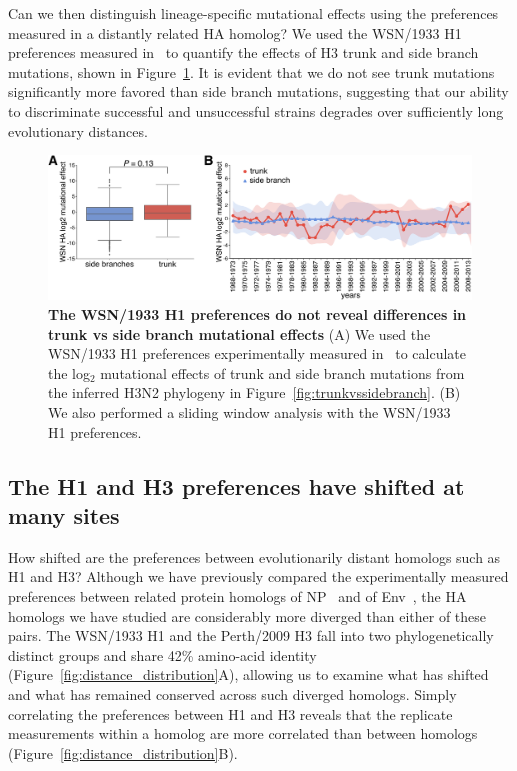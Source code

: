 \documentclass[9pt,twocolumn,twoside]{pnas-new}
\begin{document}
Can we then distinguish lineage-specific mutational effects using the preferences measured in a distantly related HA homolog?
We used the WSN/1933 H1 preferences measured in~\cite{doud2016accurate} to quantify the effects of H3 trunk and side branch mutations, shown in Figure~\ref{fig:WSN_trunkvssidebranch}.
It is evident that we do not see trunk mutations significantly more favored than side branch mutations, suggesting that our ability to discriminate successful and unsuccessful strains degrades over sufficiently long evolutionary distances. 

\begin{figure}
\centering
\includegraphics[width=15cm]{figs/WSN_trunkvssidebranch/WSN_trunkvssidebranch.pdf}
\caption{\label{fig:WSN_trunkvssidebranch}
{\bf The WSN/1933 H1 preferences do not reveal differences in trunk vs side branch mutational effects}
(A) We used the WSN/1933 H1 preferences experimentally measured in~\cite{doud2016accurate} to calculate the log$_{2}$ mutational effects of trunk and side branch mutations from the inferred H3N2 phylogeny in Figure~\ref{fig:trunkvssidebranch}.
(B) We also performed a sliding window analysis with the WSN/1933 H1 preferences.
}
\end{figure}

\subsection*{The H1 and H3 preferences have shifted at many sites}
How shifted are the preferences between evolutionarily distant homologs such as H1 and H3?
Although we have previously compared the experimentally measured preferences between related protein homologs of NP~\cite{doud2015site} and of Env~\cite{haddox2017mapping}, the HA homologs we have studied are considerably more diverged than either of these pairs.
The WSN/1933 H1 and the Perth/2009 H3 fall into two phylogenetically distinct groups and share 42\% amino-acid identity (Figure~\ref{fig:distance_distribution}A), allowing us to examine what has shifted and what has remained conserved across such diverged homologs.
Simply correlating the preferences between H1 and H3 reveals that the replicate measurements within a homolog are more correlated than between homologs (Figure~\ref{fig:distance_distribution}B).
\end{document}
